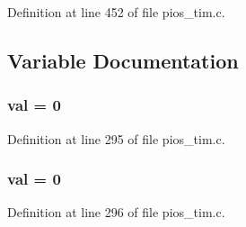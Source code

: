Definition at line 452 of file pios\-\_\-tim.\-c.



\subsection{Variable Documentation}
\hypertarget{group___p_i_o_s___t_i_m_ga757344f09097232d715d55cbf9d61a43}{
\subsubsection[{val}]{ val = 0}}\label{group___p_i_o_s___t_i_m_ga757344f09097232d715d55cbf9d61a43}


Definition at line 295 of file pios\-\_\-tim.\-c.

\hypertarget{group___p_i_o_s___t_i_m_ga757344f09097232d715d55cbf9d61a43}{
\subsubsection[{val}]{ val = 0}}\label{group___p_i_o_s___t_i_m_ga757344f09097232d715d55cbf9d61a43}


Definition at line 296 of file pios\-\_\-tim.\-c.

